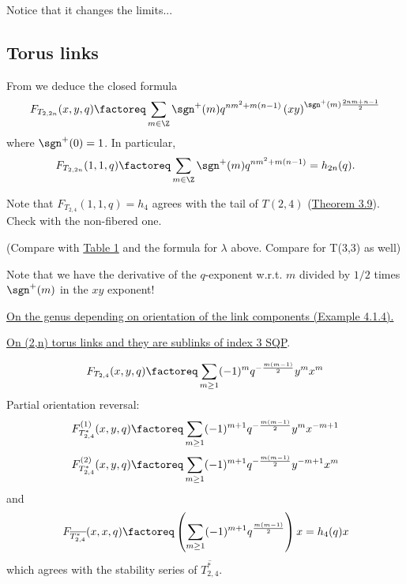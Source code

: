 \documentclass[11pt,e-only]{amsart}
\begin{document}
 \alert{Notice that it changes the limits...}

\subsection{Torus links}

From \cite{Park20} we deduce the closed formula
\begin{equation}
    F_{T_{2,2n}}(x,y,q) \factoreq \sum_{m\in\Z} \sgn^+{(m)} q^{n m^2 + m(n-1)} \left(x y\right)^{\sgn^+{(m)}\frac{2 n m+n-1}{2}}
\end{equation}
where $\sgn^+{(0)}=1$. In particular,
\begin{equation}
    F_{T_{2,2n}}(1,1,q) \factoreq \sum_{m\in\Z} \sgn^+{(m)} q^{n m^2 + m(n-1)}= h_{2n}(q).
\end{equation}

Note that $F_{T_{2,4}}(1,1,q)=h_4$ agrees with the tail of $T(2,4)$ (\href{https://arxiv.org/pdf/1106.3948}{Theorem 3.9}). \alert{Check with the non-fibered one.}

(Compare with \href{https://msp.org/agt/2024/24-1/agt-v24-n1-p05-p.pdf}{Table 1} and the formula for $\lambda$ above. Compare for T(3,3) as well)

Note that we have the derivative of the $q$-exponent w.r.t. $m$ divided by $1/2$ times $\sgn^+{(m)}$ in the $x y$ exponent!

\href{https://link.springer.com/book/10.1007/978-3-0348-9227-8}{On the genus depending on orientation of the link components (Example 4.1.4).}

\href{https://stoimenov.net/stoimeno/homepage/papers/quasi2_subl.pdf}{On (2,n) torus links and they are sublinks of index 3 SQP}.

\begin{equation}
    F_{T_{2,4}}(x,y,q) \factoreq \sum_{m\geq 1} (-1)^{m}q^{-\frac{m(m-1)}{2}}y^m x^{m}
\end{equation}
\alert{Partial orientation reversal:}
\begin{equation}
    F^{(1)}_{T_{2,4}^*}(x,y,q) \factoreq \sum_{m\geq 1} (-1)^{m+1}q^{-\frac{m(m-1)}{2}}y^m x^{-m+1}
\end{equation}
\begin{equation}
    F^{(2)}_{T_{2,4}^*}(x,y,q) \factoreq \sum_{m\geq 1} (-1)^{m+1}q^{-\frac{m(m-1)}{2}}y^{-m+1} x^{m}
\end{equation}
and 
\begin{equation}
    F_{\overline{T_{2,4}^*}}(x,x,q) \factoreq \left(\sum_{m\geq 1} (-1)^{m+1}q^{\frac{m(m-1)}{2}}\right) x = h_4(q) x
\end{equation}
which agrees with the stability series of $\overline{T_{2,4}^*}$. 
\end{document}
